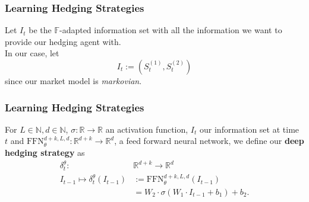 \documentclass[serif]{beamer}
\def\R{{\mathbb R}}
\def\N{{\mathbb N}}
\def\F{{\mathbb F}}
\def\vs{{\vspace{0.5cm}}}
\begin{document}
\begin{frame}
    \frametitle{Learning Hedging Strategies}
    \begin{definition}
        Let $I_t$ be the $\F$-adapted information
        set with all the information we want to provide our
        hedging agent with. \\ \vs
        In our case, let
        \[
            I_t := (S^{(1)}_t, S^{(2)}_t)
        \]
        since our market model is \emph{markovian}.
    \end{definition}
\end{frame}

\begin{frame}
    \frametitle{Learning Hedging Strategies}
    \begin{definition}
        For $L \in \N, d \in \N$, $\sigma: \R \to \R$
        an activation function,
        $I_t$ our information set at time $t$ and
        $\text{FFN}_\theta^{d+k, L, d} : \R^{d+k} \to \R^d$,
        a feed forward neural network, we define
        our \textbf{deep hedging strategy} as
        \begin{align*}
            \delta^\theta_t:
            \;\; & \R^{d+k} \to \R^d                                   \\
            I_{t-1} \mapsto \delta^\theta_t (I_{t-1})
                 & := \text{FFN}_\theta^{d+k, L, d} (I_{t-1})          \\
                 & = W_2 \cdot \sigma (W_1 \cdot I_{t-1} + b_1) + b_2.
        \end{align*}
    \end{definition}
\end{frame}
\end{document}
